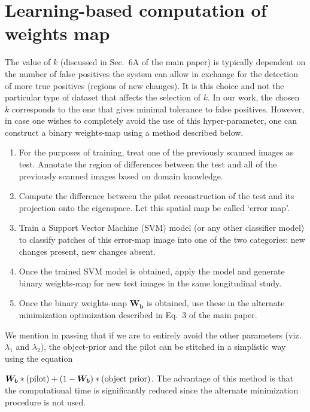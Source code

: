 \documentclass{article}
\begin{document}
\section{Learning-based computation of weights map}

The value of $k$ (discussed in Sec.~6A of the main paper) is typically
dependent on the number of false positives the system can allow in
exchange for the detection of more true positives (regions of new
changes). It is this choice and not the particular type of dataset
that affects the selection of $k$. In our work, the chosen $k$
corresponds to the one that gives minimal tolerance to false
positives. However, in case one wishes to completely avoid the use of
this hyper-parameter, one can construct a binary weights-map using a
method described below.

\begin{enumerate}
\item For the purposes of training, treat one of the previously
  scanned images as test. Annotate the region of differences between
  the test and all of the previously scanned images based on domain
  knowledge.

\item Compute the difference between the pilot reconstruction of the
  test and its projection onto the eigenspace. Let this spatial map be
  called `error map'.

\item Train a Support Vector Machine (SVM) model (or any other
  classifier model) to classify patches of this error-map image into
  one of the two categories: new changes present, new changes absent.

\item Once the trained SVM model is obtained, apply the model and
  generate binary weights-map for new test images in the same
  longitudinal study.

\item Once the binary weights-map $\boldsymbol{W_b}$ is obtained, use
  these in the alternate minimization optimization described in Eq.~3
  of the main paper.
\end{enumerate}

We mention in passing that if we are to entirely avoid the other
parameters (viz. $\lambda_1$ and $\lambda_2$), the object-prior and the pilot
can be stitched in a simplistic way using the equation

$\boldsymbol{W_b}*(\rm{pilot}) + (1-\boldsymbol{W_b})*(\rm{object\textrm{ }prior})$.
The advantage of this method is that the computational time is
significantly reduced since the alternate minimization procedure is not
used. 
\end{document}
